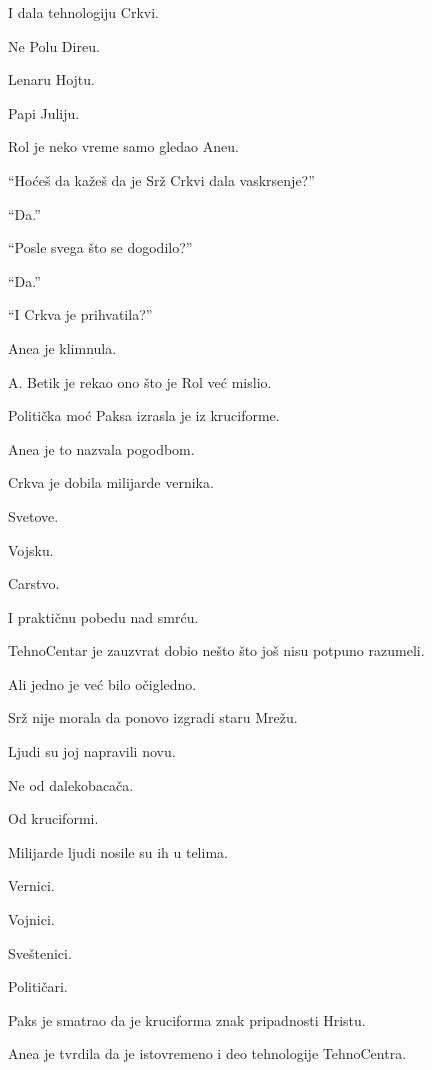 I dala tehnologiju Crkvi.

\bigskip

Ne Polu Direu.

Lenaru Hojtu.

\bigskip

Papi Juliju.

\bigskip

Rol je neko vreme samo gledao Aneu.

``Hoćeš da kažeš da je Srž Crkvi dala vaskrsenje?''

``Da.''

``Posle svega što se dogodilo?''

``Da.''

``I Crkva je prihvatila?''

Anea je klimnula.

\bigskip

A. Betik je rekao ono što je Rol već mislio.

Politička moć Paksa izrasla je iz kruciforme.

\bigskip

Anea je to nazvala pogodbom.

Crkva je dobila milijarde vernika.

Svetove.

Vojsku.

Carstvo.

I praktičnu pobedu nad smrću.

\bigskip

TehnoCentar je zauzvrat dobio nešto što još nisu potpuno razumeli.

\bigskip

Ali jedno je već bilo očigledno.

Srž nije morala da ponovo izgradi staru Mrežu.

Ljudi su joj napravili novu.

\bigskip

Ne od dalekobacača.

Od kruciformi.

\bigskip

Milijarde ljudi nosile su ih u telima.

Vernici.

Vojnici.

Sveštenici.

Političari.

\bigskip

Paks je smatrao da je kruciforma znak pripadnosti Hristu.

Anea je tvrdila da je istovremeno i deo tehnologije TehnoCentra.

